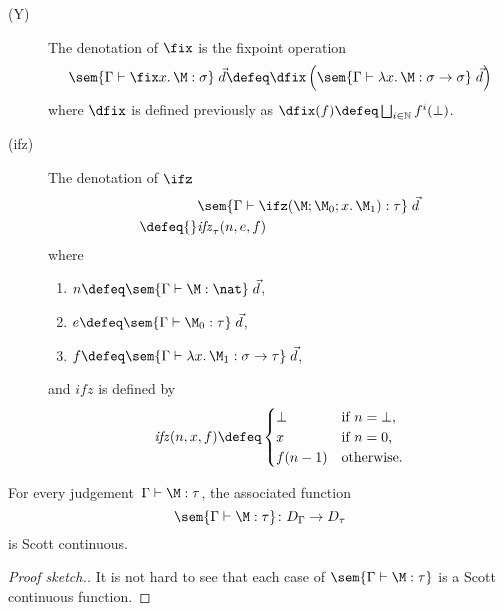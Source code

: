 \begin{frame}
  \begin{description}
    \item[(Y)] The denotation of $\fix$ is the fixpoint operation 
      \[
        \sem{\Gamma \vdash \fix x.\, \M : \sigma}\;\vec{d} \defeq
        \dfix
        \left(
          \sem{\Gamma \vdash \lambda x.\, \M : \sigma \to \sigma}\;\vec{d}
        \right)
      \]
      where $\dfix$ is defined previously as $\dfix(f) \defeq \bigsqcup_{i \in
        \mathbb{N}} f^i(\bot)$.
    \item[(ifz)] The denotation of $\ifz$ 
      \begin{align*}
        & \sem{\Gamma \vdash \ifz(\M; \M_0; x.\,\M_1) : \tau}\;\vec{d} \\
        \defeq{} & \mathit{ifz}_\tau (n , e, f)
      \end{align*}
      where
      \begin{enumerate}
        \item $n \defeq \sem{\Gamma \vdash \M  : \nat}\;\vec{d}$, 
        \item $e \defeq \sem{\Gamma \vdash \M_0 : \tau}\;\vec{d}$, 
        \item $f \defeq \sem{\Gamma \vdash \lambda x.\, \M_1 : \sigma\to\tau}\; \vec{d}$,
      \end{enumerate} and $\mathit{ifz}$ is defined by
          \[
            \mathit{ifz}(n, x, f) \defeq
            \begin{cases}
              \bot & \text{if $n = \bot$,} \\
              x   & \text{if $n = 0$,} \\
              f(n-1) & \text{otherwise.} \\
            \end{cases}
          \]
      \end{description}
\end{frame}

\begin{frame}
  \begin{theorem}
    For every judgement~$\Gamma \vdash \M:\tau$, 
    the associated function
    \[
      \sem{\Gamma \vdash \M : \tau} \colon D_\Gamma \to D_{\tau}
    \]
    is Scott continuous. 
  \end{theorem}
  \begin{proof}[Proof sketch.]
    It is not hard to see that each case of $\sem{\Gamma \vdash \M : \tau}$
    is a Scott continuous function.
  \end{proof}
\end{frame}

